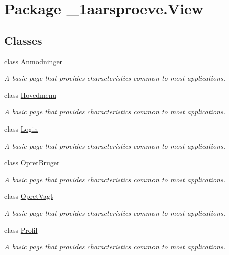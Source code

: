 \hypertarget{namespace__1aarsproeve_1_1_view}{}\section{Package \+\_\+1aarsproeve.\+View}
\label{namespace__1aarsproeve_1_1_view}
\subsection*{Classes}
\begin{DoxyCompactItemize}
\item 
class \hyperlink{class__1aarsproeve_1_1_view_1_1_anmodninger}{Anmodninger}
\begin{DoxyCompactList}\small\item\em A basic page that provides characteristics common to most applications. \end{DoxyCompactList}\item 
class \hyperlink{class__1aarsproeve_1_1_view_1_1_hovedmenu}{Hovedmenu}
\begin{DoxyCompactList}\small\item\em A basic page that provides characteristics common to most applications. \end{DoxyCompactList}\item 
class \hyperlink{class__1aarsproeve_1_1_view_1_1_login}{Login}
\begin{DoxyCompactList}\small\item\em A basic page that provides characteristics common to most applications. \end{DoxyCompactList}\item 
class \hyperlink{class__1aarsproeve_1_1_view_1_1_opret_bruger}{Opret\+Bruger}
\begin{DoxyCompactList}\small\item\em A basic page that provides characteristics common to most applications. \end{DoxyCompactList}\item 
class \hyperlink{class__1aarsproeve_1_1_view_1_1_opret_vagt}{Opret\+Vagt}
\begin{DoxyCompactList}\small\item\em A basic page that provides characteristics common to most applications. \end{DoxyCompactList}\item 
class \hyperlink{class__1aarsproeve_1_1_view_1_1_profil}{Profil}
\begin{DoxyCompactList}\small\item\em A basic page that provides characteristics common to most applications. \end{DoxyCompactList}\item 

\end{DoxyCompactItemize}
